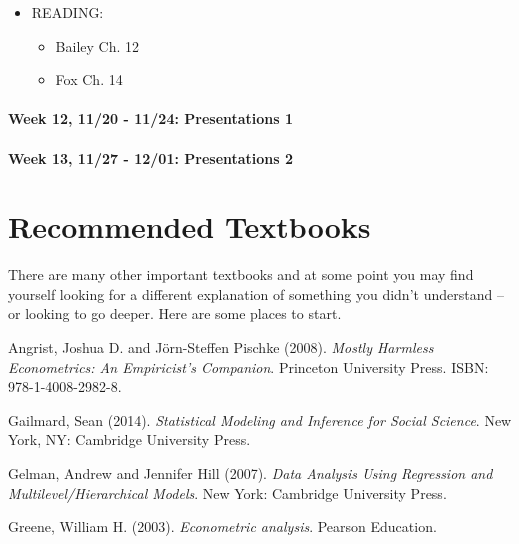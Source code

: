 \documentclass[11pt,]{article}
\providecommand{\tightlist}{%
  \setlength{\itemsep}{0pt}\setlength{\parskip}{0pt}}
\begin{document}
\begin{itemize}
\tightlist
\item
  READING:

  \begin{itemize}
  \tightlist
  \item
    Bailey Ch. 12
  \item
    Fox Ch. 14
  \end{itemize}
\end{itemize}

\paragraph{Week 12, 11/20 - 11/24: Presentations
1}\label{week-12-1120---1124-presentations-1}

\paragraph{Week 13, 11/27 - 12/01: Presentations
2}\label{week-13-1127---1201-presentations-2}

\section{Recommended Textbooks}\label{recommended-textbooks}

There are many other important textbooks and at some point you may find
yourself looking for a different explanation of something you didn't
understand -- or looking to go deeper. Here are some places to start.

 Angrist, Joshua D. and Jörn-Steffen Pischke (2008).
\emph{Mostly Harmless Econometrics: An Empiricist's Companion}.
Princeton University Press. ISBN: 978-1-4008-2982-8.

 Gailmard, Sean (2014).
\emph{Statistical Modeling and Inference for Social Science}. New York,
NY: Cambridge University Press.

 Gelman, Andrew and Jennifer Hill (2007).
\emph{Data Analysis Using Regression and
Multilevel/Hierarchical Models}. New York: Cambridge University Press.

 Greene, William H. (2003).
\emph{Econometric analysis}. Pearson Education.
\end{document}

